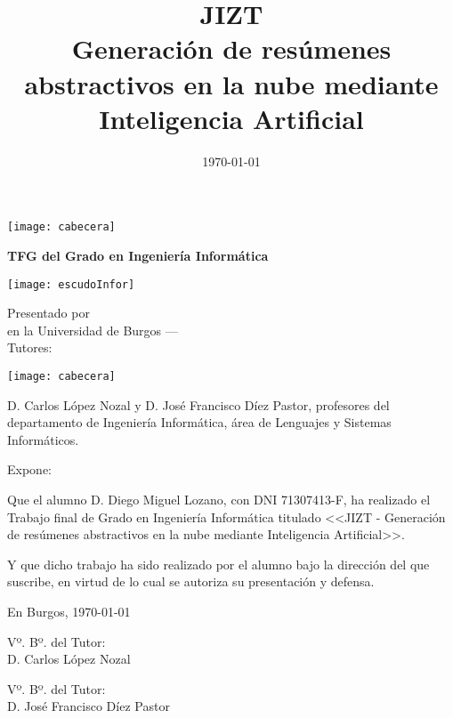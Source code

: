 \documentclass[a4paper,12pt,twoside]{memoir}
\title{\fontsize{25}{25}\selectfont JIZT \\[0.5cm] \fontsize{15}{15}\selectfont Generación de resúmenes abstractivos en la nube mediante Inteligencia Artificial}
\author{\nombre}
\date{\today}
\makeatletter
\def\maketitle{
	\null
	\thispagestyle{empty}
	\noindent\texttt{[image: cabecera]}\vspace{1cm}%
	\vfill
	\colorbox{cpardoBox}{%
		\begin{minipage}{.8\textwidth}
			\vspace{.5cm}\Large
			\begin{center}
				\textbf{TFG del Grado en Ingeniería Informática}\vspace{.6cm}\\
				\textbf{\LARGE\@title{}}
			\end{center}
			\vspace{.2cm}
		\end{minipage}
		
	}%
	\hfill\begin{minipage}{.20\textwidth}
		\texttt{[image: escudoInfor]}
	\end{minipage}
	\vfill
	\begin{center}%
		{%
			\noindent\fontsize{18}{18}\selectfont
			Presentado por \@author{}\\ 
			en la Universidad de Burgos --- \@date{}\\
			Tutores: \@tutor{}\\
		}%
	\end{center}%
	\null
	\cleardoublepage
}
\newcommand{\nombre}{Diego Miguel Lozano} %
\makeatother
\begin{document}
	
	\maketitle
	
	
	\thispagestyle{empty}
	
	
	\noindent\texttt{[image: cabecera]}\vspace{1cm}
	
	\noindent D. Carlos López Nozal y D. José Francisco Díez Pastor, profesores del departamento de Ingeniería Informática, área de Lenguajes y Sistemas Informáticos.
	
	\noindent Expone:
	
	\noindent Que el alumno D. \nombre, con DNI 71307413-F, ha realizado el Trabajo final de Grado en Ingeniería Informática titulado <<JIZT - Generación de resúmenes abstractivos en la nube mediante Inteligencia Artificial>>. 
	
	\noindent Y que dicho trabajo ha sido realizado por el alumno bajo la dirección del que suscribe, en virtud de lo cual se autoriza su presentación y defensa.
	
	\begin{center} %
		En Burgos, {\large \today}
	\end{center}
	
	\vfill\vfill\vfill
	
	\begin{minipage}{0.45\textwidth}
		\begin{flushleft} %
			Vº. Bº. del Tutor:\\[2cm]
			D. Carlos López Nozal
		\end{flushleft}
	\end{minipage}
	\hfill
	\begin{minipage}{0.45\textwidth}
		\begin{flushleft} %
			Vº. Bº. del Tutor:\\[2cm]
			D. José Francisco Díez Pastor
		\end{flushleft}
	\end{minipage}
	\hfill
	
	\vfill
	
	
	
	\newpage\null\thispagestyle{empty}\newpage
	
	
	
\end{document}
